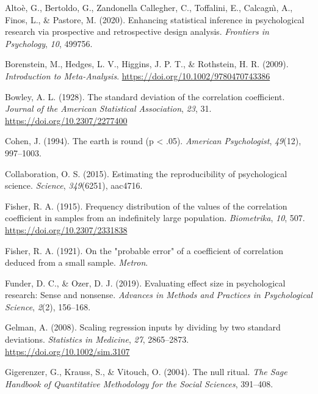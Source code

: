 \documentclass[
  man]{apa7}
\newlength{\cslhangindent}
\newlength{\cslentryspacingunit} %
\newenvironment{CSLReferences}[2] %
 {%
  \setlength{\parindent}{0pt}
  \ifodd #1
  \let\oldpar\par
  \def\par{\hangindent=\cslhangindent\oldpar}
  \fi
  \setlength{\parskip}{#2\cslentryspacingunit}
 }%
 {}
\begin{document}
\hypertarget{refs}{}
\begin{CSLReferences}{1}{0}
\leavevmode{}%
Altoè, G., Bertoldo, G., Zandonella Callegher, C., Toffalini, E., Calcagnı̀, A., Finos, L., \& Pastore, M. (2020). Enhancing statistical inference in psychological research via prospective and retrospective design analysis. \emph{Frontiers in Psychology}, \emph{10}, 499756.

\leavevmode{}%
Borenstein, M., Hedges, L. V., Higgins, J. P. T., \& Rothstein, H. R. (2009). \emph{Introduction to {Meta-Analysis}}. \url{https://doi.org/10.1002/9780470743386}

\leavevmode{}%
Bowley, A. L. (1928). The standard deviation of the correlation coefficient. \emph{Journal of the American Statistical Association}, \emph{23}, 31. \url{https://doi.org/10.2307/2277400}

\leavevmode{}%
Cohen, J. (1994). The earth is round (p \textless{} .05). \emph{American Psychologist}, \emph{49}(12), 997--1003.

\leavevmode{}%
Collaboration, O. S. (2015). Estimating the reproducibility of psychological science. \emph{Science}, \emph{349}(6251), aac4716.

\leavevmode{}%
Fisher, R. A. (1915). Frequency distribution of the values of the correlation coefficient in samples from an indefinitely large population. \emph{Biometrika}, \emph{10}, 507. \url{https://doi.org/10.2307/2331838}

\leavevmode{}%
Fisher, R. A. (1921). On the "probable error" of a coefficient of correlation deduced from a small sample. \emph{Metron}.

\leavevmode{}%
Funder, D. C., \& Ozer, D. J. (2019). Evaluating effect size in psychological research: Sense and nonsense. \emph{Advances in Methods and Practices in Psychological Science}, \emph{2}(2), 156--168.

\leavevmode{}%
Gelman, A. (2008). Scaling regression inputs by dividing by two standard deviations. \emph{Statistics in Medicine}, \emph{27}, 2865--2873. \url{https://doi.org/10.1002/sim.3107}

\leavevmode{}%
Gigerenzer, G., Krauss, S., \& Vitouch, O. (2004). The null ritual. \emph{The Sage Handbook of Quantitative Methodology for the Social Sciences}, 391--408.


\end{CSLReferences}
\end{document}
